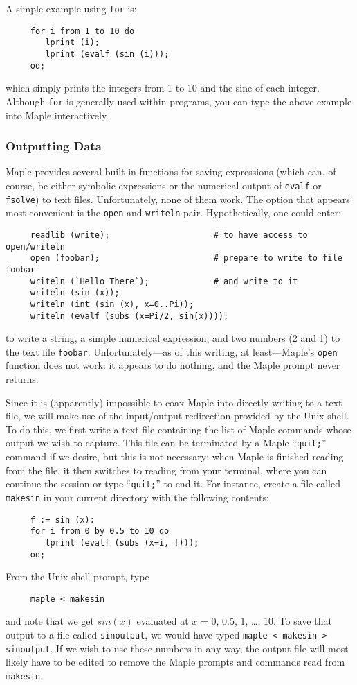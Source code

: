 A simple example using \verb|for| is:
\begin{verbatim}
     for i from 1 to 10 do
        lprint (i);
        lprint (evalf (sin (i)));
     od;
\end{verbatim}
which simply prints the integers from 1 to 10 and the sine of each
integer.  Although \verb|for| is generally used within programs, you
can type the above example into Maple interactively.


\subsubsection{Outputting Data}

Maple provides several built-in functions for saving expressions
(which can, of course, be either symbolic expressions or the numerical
output of \verb|evalf| or \verb|fsolve|) to text files.
Unfortunately, none of them work.  The option that appears most
convenient is the \verb|open| and \verb|writeln| pair.
Hypothetically, one could enter:
\begin{verbatim}
     readlib (write);                     # to have access to open/writeln
     open (foobar);                       # prepare to write to file foobar
     writeln (`Hello There`);             # and write to it
     writeln (sin (x));
     writeln (int (sin (x), x=0..Pi));
     writeln (evalf (subs (x=Pi/2, sin(x))));
\end{verbatim}
to write a string, a simple numerical expression, and two numbers (2
and 1) to the text file \verb|foobar|.  Unfortunately---as of this
writing, at least---Maple's \verb|open| function does not work: it 
appears to do nothing, and the Maple prompt never returns.

Since it is (apparently) impossible to coax Maple into directly
writing to a text file, we will make use of the input/output
redirection provided by the Unix shell.  To do this, we first write a
text file containing the list of Maple commands whose output we wish
to capture.  This file can be terminated by a Maple ``\verb|quit;|''
command if we desire, but this is not necessary: when Maple is
finished reading from the file, it then switches to reading from your
terminal, where you can continue the session or type ``\verb|quit;|'' to
end it.  For instance, create a file called \verb|makesin| in your
current directory with the following contents:
\begin{verbatim}
     f := sin (x):
     for i from 0 by 0.5 to 10 do
        lprint (evalf (subs (x=i, f)));
     od;
\end{verbatim}
From the Unix shell prompt, type
\begin{verbatim}
     maple < makesin
\end{verbatim}
and note that we get $sin(x)$ evaluated at $x$ = 0, 0.5, 1, \ldots, 10.  To
save that output to a file called \verb|sinoutput|, we would have
typed \verb|maple < makesin > sinoutput|.  If we wish to use these
numbers in any way, the output file will most likely have to be edited
to remove the Maple prompts and commands read from \verb|makesin|.


